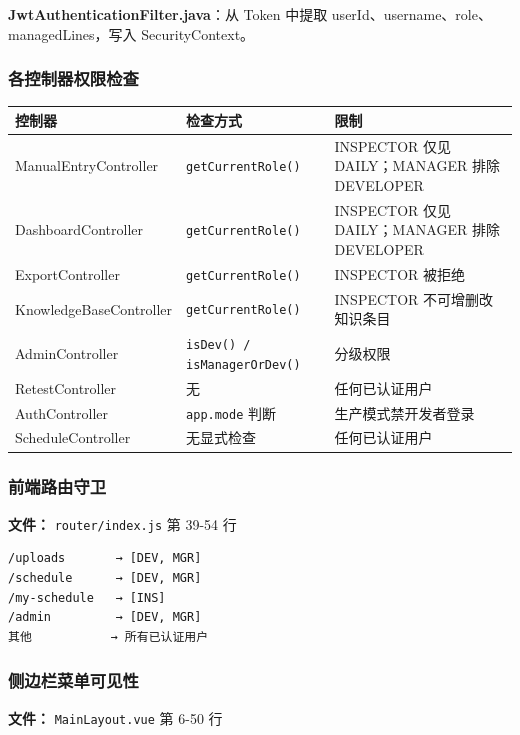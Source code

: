 \documentclass[12pt,a4paper]{ctexart}
\begin{document}
\textbf{JwtAuthenticationFilter.java}：从 Token 中提取 userId、username、role、managedLines，写入 SecurityContext。

\subsubsection{各控制器权限检查}

\begin{longtable}{|l|l|l|}
\hline
\textbf{控制器} & \textbf{检查方式} & \textbf{限制} \\
\hline
\endfirsthead
\hline
\endhead
\hline
ManualEntryController & \texttt{getCurrentRole()} & INSPECTOR 仅见 DAILY；MANAGER 排除 DEVELOPER \\
DashboardController & \texttt{getCurrentRole()} & INSPECTOR 仅见 DAILY；MANAGER 排除 DEVELOPER \\
ExportController & \texttt{getCurrentRole()} & INSPECTOR 被拒绝 \\
KnowledgeBaseController & \texttt{getCurrentRole()} & INSPECTOR 不可增删改知识条目 \\
AdminController & \texttt{isDev() / isManagerOrDev()} & 分级权限 \\
RetestController & 无 & 任何已认证用户 \\
AuthController & \texttt{app.mode} 判断 & 生产模式禁开发者登录 \\
ScheduleController & 无显式检查 & 任何已认证用户 \\
\hline
\end{longtable}

\subsubsection{前端路由守卫}

\textbf{文件：} \texttt{router/index.js} 第 39-54 行

\begin{verbatim}
/uploads       → [DEV, MGR]
/schedule      → [DEV, MGR]
/my-schedule   → [INS]
/admin         → [DEV, MGR]
其他           → 所有已认证用户
\end{verbatim}

\subsubsection{侧边栏菜单可见性}

\textbf{文件：} \texttt{MainLayout.vue} 第 6-50 行
\end{document}
